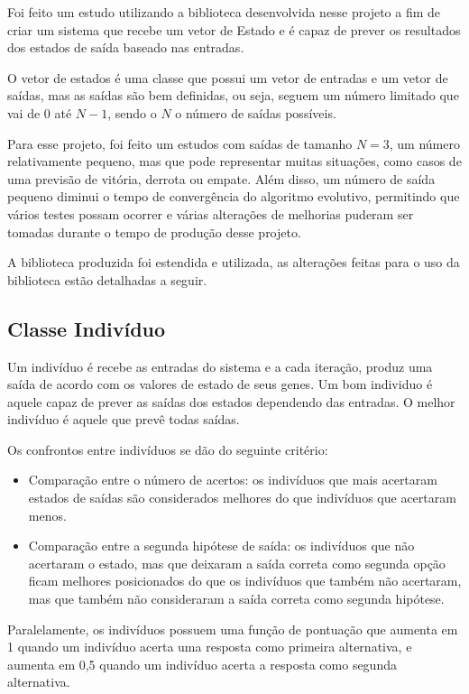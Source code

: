 Foi feito um estudo utilizando a biblioteca desenvolvida nesse projeto a fim de criar um sistema que recebe um vetor de Estado e é capaz de prever os resultados dos estados de saída baseado nas entradas.

O vetor de estados é uma classe que possui um vetor de entradas e um vetor de saídas, mas as saídas são bem definidas, ou seja, seguem um número limitado que vai de 0 até $N-1$, sendo o $N$ o número de saídas possíveis.

Para esse projeto, foi feito um estudos com saídas de tamanho $N=3$, um número relativamente pequeno, mas que pode representar muitas situações, como casos de uma previsão de vitória, derrota ou empate. Além disso, um número de saída pequeno diminui o tempo de convergência do algoritmo evolutivo, permitindo que vários testes possam ocorrer e várias alterações de melhorias puderam ser tomadas durante o tempo de produção desse projeto.

A biblioteca produzida foi estendida e utilizada, as alterações feitas para o uso da biblioteca estão detalhadas a seguir.

\subsection{Classe Indivíduo}

Um indivíduo é recebe as entradas do sistema e a cada iteração, produz uma saída de acordo com os valores de estado de seus genes. Um bom individuo é aquele capaz de prever as saídas dos estados dependendo das entradas. O melhor indivíduo é aquele que prevê todas saídas.

Os confrontos entre indivíduos se dão do seguinte critério:
\begin{itemize}
    \item Comparação entre o número de acertos: os indivíduos que mais acertaram estados de saídas são considerados melhores do que indivíduos que acertaram menos.
    \item Comparação entre a segunda hipótese de saída: os indivíduos que não acertaram o estado, mas que deixaram a saída correta como segunda opção ficam melhores posicionados do que os indivíduos que também não acertaram, mas que também não consideraram a saída correta como segunda hipótese.
\end{itemize}

Paralelamente, os indivíduos possuem uma função de pontuação que aumenta em 1 quando um indivíduo acerta uma resposta como primeira alternativa, e aumenta em 0,5 quando um indivíduo acerta a resposta como segunda alternativa.

